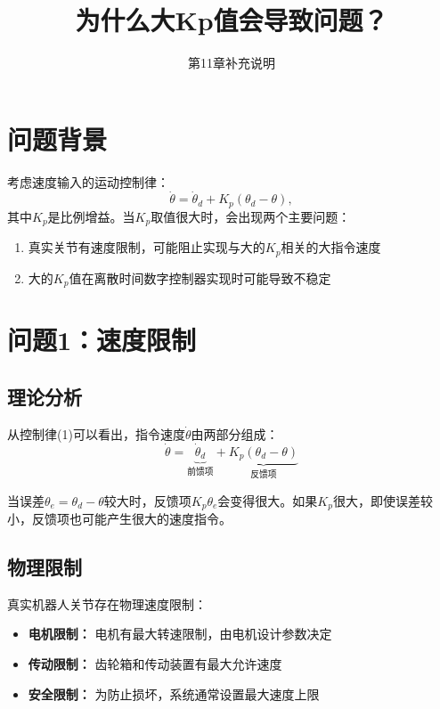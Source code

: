 \documentclass[12pt,a4paper]{article}
\title{为什么大Kp值会导致问题？}
\author{第11章补充说明}
\date{}
\begin{document}
\maketitle

\section{问题背景}

考虑速度输入的运动控制律：
\begin{equation}
\dot{\theta} = \dot{\theta}_d + K_p(\theta_d - \theta),
\end{equation}
其中$K_p$是比例增益。当$K_p$取值很大时，会出现两个主要问题：

\begin{enumerate}
\item 真实关节有速度限制，可能阻止实现与大的$K_p$相关的大指令速度
\item 大的$K_p$值在离散时间数字控制器实现时可能导致不稳定
\end{enumerate}

\section{问题1：速度限制}

\subsection{理论分析}

从控制律(1)可以看出，指令速度$\dot{\theta}$由两部分组成：
\begin{equation}
\dot{\theta} = \underbrace{\dot{\theta}_d}_{\text{前馈项}} + \underbrace{K_p(\theta_d - \theta)}_{\text{反馈项}}
\end{equation}

当误差$\theta_e = \theta_d - \theta$较大时，反馈项$K_p \theta_e$会变得很大。如果$K_p$很大，即使误差较小，反馈项也可能产生很大的速度指令。

\subsection{物理限制}

真实机器人关节存在物理速度限制：
\begin{itemize}
\item \textbf{电机限制：} 电机有最大转速限制，由电机设计参数决定
\item \textbf{传动限制：} 齿轮箱和传动装置有最大允许速度
\item \textbf{安全限制：} 为防止损坏，系统通常设置最大速度上限
\end{itemize}
\end{document}
